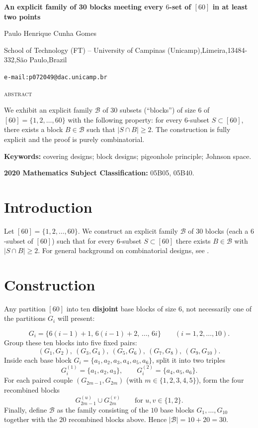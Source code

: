 \documentclass[10pt]{article}
\newcommand{\set}[1]{\{#1\}}
\begin{document}
\begin{center}
{\bfseries\Large An explicit family of 30 blocks meeting every $6$-set of $[60]$ in at least two points\par}
\vspace{1.0ex}
{\normalsize Paulo Henrique Cunha Gomes\par}
{\normalsize School of Technology (FT) – University of Campinas (Unicamp),Limeira,13484-332,São Paulo,Brazil\par}
{\normalsize \texttt{e-mail:p072049@dac.unicamp.br}\par} %
\end{center}

\vspace{1.25ex}

\noindent\textsc{abstract}\par
\noindent
We exhibit an explicit family $\mathcal{B}$ of $30$ subsets (``blocks'') of size $6$ of
$[60]=\{1,2,\dots,60\}$ with the following property: for every $6$-subset $S\subset[60]$,
there exists a block $B\in\mathcal{B}$ such that $|S\cap B|\ge 2$.
The construction is fully explicit and the proof is purely combinatorial.

\vspace{0.8ex}
\noindent\textbf{Keywords:} covering designs; block designs; pigeonhole principle; Johnson space.
\par
\noindent\textbf{2020 Mathematics Subject Classification:} 05B05, 05B40.
\par

\section{Introduction}
Let $[60]=\{1,2,\dots,60\}$. We construct an explicit family $\mathcal{B}$ of $30$ blocks
(each a $6$-subset of $[60]$) such that for every $6$-subset $S\subset[60]$ there exists
$B\in\mathcal{B}$ with $|S\cap B|\ge 2$. For general background on combinatorial designs,
see \cite{CD07}.

\section{Construction}
Any partition $[60]$ into ten \textbf{disjoint} base blocks of size $6$,
not necessarily one of the partitions $G_i$ will present:

\[
G_i=\set{6(i-1)+1,\,6(i-1)+2,\,\dots,\,6i}\qquad (i=1,2,\dots,10).
\]
Group these ten blocks into five fixed pairs:
\[
(G_1,G_2),\ (G_3,G_4),\ (G_5,G_6),\ (G_7,G_8),\ (G_9,G_{10}).
\]
Inside each base block $G_i=\{a_1,a_2,a_3,a_4,a_5,a_6\}$, split it into two triples
\[
G_i^{(1)}=\set{a_1,a_2,a_3},
\qquad
G_i^{(2)}=\set{a_4,a_5,a_6}.
\]
For each paired couple $(G_{2m-1},G_{2m})$ (with $m\in\{1,2,3,4,5\}$), form the four
recombined blocks
\[
G_{2m-1}^{(u)}\cup G_{2m}^{(v)}
\qquad\text{for }u,v\in\{1,2\}.
\]
Finally, define $\mathcal{B}$ as the family consisting of the $10$ base blocks
$G_1,\dots,G_{10}$ together with the $20$ recombined blocks above. Hence
$|\mathcal{B}|=10+20=30$.
\end{document}
